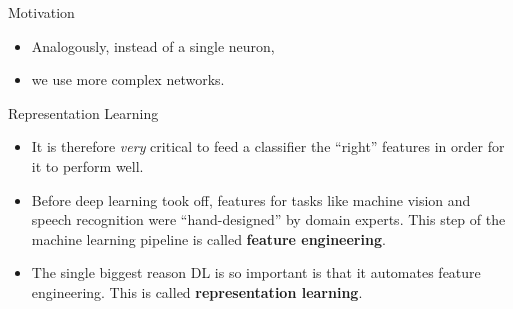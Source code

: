 \begin{vbframe}{Motivation}
\begin{itemize}
\item Analogously, instead of a single neuron, 
\begin{figure}
\centering
{}
\end{figure}
\item we use more complex networks.
\begin{figure}
\centering
{}
\end{figure}
\end{itemize}
\end{vbframe}

\begin{vbframe} {Representation Learning}
  \begin{itemize}
    \vspace{5mm}
    \item It is therefore \textit{very} critical to feed a classifier the \enquote{right} features in order for it to perform well.
    \vspace{7mm}
    \item Before deep learning took off, features for tasks like machine vision and speech recognition were \enquote{hand-designed} by domain experts. This step of the machine learning pipeline is called \textbf{feature engineering}.
    \vspace{7mm}
    \item The single biggest reason DL is so important is that it automates feature engineering. This is called \textbf{representation learning}.
  \end{itemize}
\end{vbframe}

